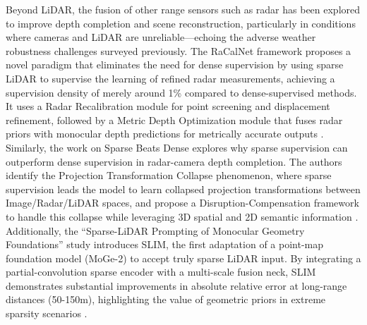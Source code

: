 \documentclass[11pt]{article}
\begin{document}
Beyond LiDAR, the fusion of other range sensors such as radar has been explored to improve depth completion and scene reconstruction, particularly in conditions where cameras and LiDAR are unreliable---echoing the adverse weather robustness challenges surveyed previously. The RaCalNet framework proposes a novel paradigm that eliminates the need for dense supervision by using sparse LiDAR to supervise the learning of refined radar measurements, achieving a supervision density of merely around 1\% compared to dense-supervised methods. It uses a Radar Recalibration module for point screening and displacement refinement, followed by a Metric Depth Optimization module that fuses radar priors with monocular depth predictions for metrically accurate outputs \cite{ref311}. Similarly, the work on Sparse Beats Dense explores why sparse supervision can outperform dense supervision in radar-camera depth completion. The authors identify the Projection Transformation Collapse phenomenon, where sparse supervision leads the model to learn collapsed projection transformations between Image/Radar/LiDAR spaces, and propose a Disruption-Compensation framework to handle this collapse while leveraging 3D spatial and 2D semantic information \cite{ref312}. Additionally, the ``Sparse-LiDAR Prompting of Monocular Geometry Foundations'' study introduces SLIM, the first adaptation of a point-map foundation model (MoGe-2) to accept truly sparse LiDAR input. By integrating a partial-convolution sparse encoder with a multi-scale fusion neck, SLIM demonstrates substantial improvements in absolute relative error at long-range distances (50-150m), highlighting the value of geometric priors in extreme sparsity scenarios \cite{ref313}.
\end{document}
